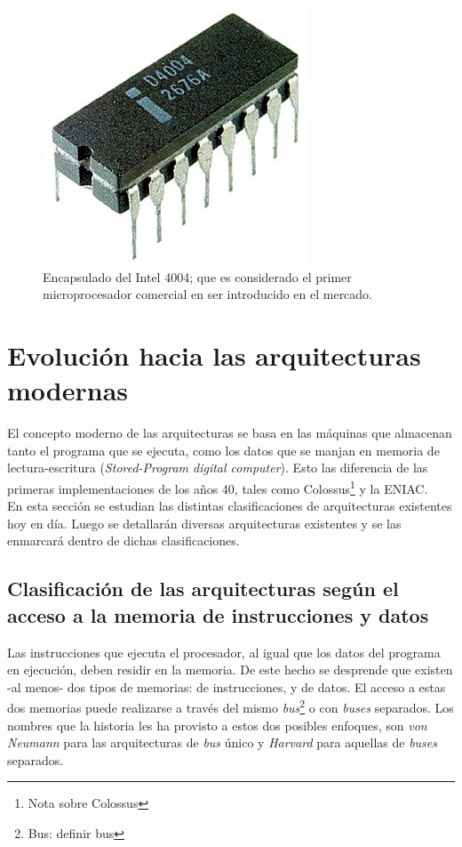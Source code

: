 \begin{figure}
  \centering
  \includegraphics[scale=0.5]{./figures/C02-intel_4004}
  \captionsetup{justification=centering}
  \caption{Encapsulado del Intel 4004; que es considerado el primer microprocesador comercial en ser introducido en el mercado.}
  \label{fig:C02-intel_4004}
\end{figure}

\section{Evolución hacia las arquitecturas modernas}

El concepto moderno de las arquitecturas se basa en las máquinas que almacenan tanto el programa que se ejecuta, como los datos que se manjan en memoria de lectura-escritura (\emph{Stored-Program digital computer}). Esto las diferencia de las primeras implementaciones de los años 40, tales como Colossus\footnote{Nota sobre Colossus} y la ENIAC.\\
En esta sección se estudian las distintas clasificaciones de arquitecturas existentes hoy en día. Luego se detallarán diversas arquitecturas existentes y se las enmarcará dentro de dichas clasificaciones.

\subsection{Clasificación de las arquitecturas según el acceso a la memoria de instrucciones y datos}

Las instrucciones que ejecuta el procesador, al igual que los datos del programa en ejecución, deben residir en la memoria. De este hecho se desprende que existen -al menos- dos tipos de memorias: de instrucciones, y de datos. El acceso a estas dos memorias puede realizarse a través del mismo \emph{bus}\footnote{Bus: definir bus} o con \emph{buses} separados. Los nombres que la historia les ha provisto a estos dos posibles enfoques, son \emph{von Neumann} para las arquitecturas de \emph{bus} único y \emph{Harvard} para aquellas de \emph{buses} separados.

